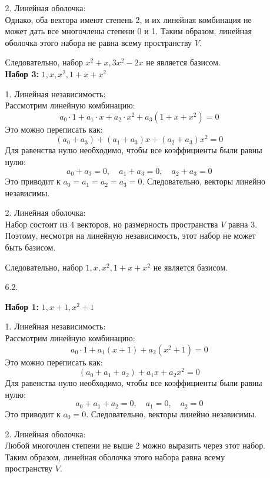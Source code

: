 \documentclass[a4paper]{article}
\begin{document}
\begin{enumerate}
\begin{enumerate}
        2. Линейная оболочка: \\
        Однако, оба вектора имеют степень 2, и их линейная комбинация не может дать все многочлены степени 0 и 1. Таким образом, линейная оболочка этого набора не равна всему пространству $ V $.

        Следовательно, набор $ x^2 + x, 3x^2 - 2x $ не является базисом.\\

                
        \textbf{Набор 3:} $ 1, x, x^2, 1 + x + x^2 $

        1. Линейная независимость: \\
        Рассмотрим линейную комбинацию:
        $$
        a_0 \cdot 1 + a_1 \cdot x + a_2 \cdot x^2 + a_3 (1 + x + x^2) = 0
        $$
        Это можно переписать как:
        $$
        (a_0 + a_3) + (a_1 + a_3)x + (a_2 + a_3)x^2 = 0
        $$
        Для равенства нулю необходимо, чтобы все коэффициенты были равны нулю:
        $$
        a_0 + a_3 = 0, \quad a_1 + a_3 = 0, \quad a_2 + a_3 = 0
        $$
        Это приводит к $ a_0 = a_1 = a_2 = a_3 = 0 $. Следовательно, векторы линейно независимы.

        2. Линейная оболочка: \\
        Набор состоит из 4 векторов, но размерность пространства $ V $ равна 3. Поэтому, несмотря на линейную независимость, этот набор не может быть базисом.

        Следовательно, набор $ 1, x, x^2, 1 + x + x^2 $ не является базисом.\\

        \item[6.2.]
                
        \textbf{Набор 1:} $ 1, x + 1, x^2 + 1 $

        1. Линейная независимость:\\ 
        Рассмотрим линейную комбинацию:
        $$
        a_0 \cdot 1 + a_1 (x + 1) + a_2 (x^2 + 1) = 0
        $$
        Это можно переписать как:
        $$
        (a_0 + a_1 + a_2) + a_1 x + a_2 x^2 = 0
        $$
        Для равенства нулю необходимо, чтобы все коэффициенты были равны нулю:
        $$
        a_0 + a_1 + a_2 = 0, \quad a_1 = 0, \quad a_2 = 0
        $$
        Это приводит к $ a_0 = 0 $. Следовательно, векторы линейно независимы.

        2. Линейная оболочка: \\
        Любой многочлен степени не выше 2 можно выразить через этот набор. Таким образом, линейная оболочка этого набора равна всему пространству $ V $.


\end{enumerate}
\end{enumerate}
\end{document}
